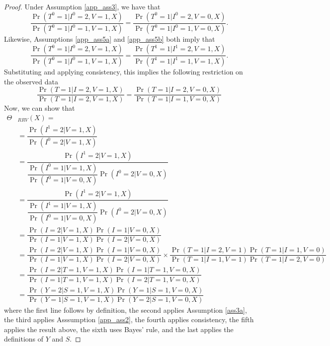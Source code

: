 \begin{appendix}
\begin{refsection}
\begin{proposition}
    \end{proposition}
    \begin{proof}
        Under Assumption \ref{app_ass3}, we have that 
        \[\dfrac{\Pr(T^0 = 1 | I^0 = 2, V = 1, X)}{\Pr(T^0 = 1 | I^0 = 1, V = 1, X)} = \dfrac{\Pr(T^0 = 1 | I^0 = 2, V = 0, X)}{\Pr(T^0 = 1 | I^0 = 1, V = 0, X)}.\]
        Likewise, Assumptions \ref{app_ass5a} and \ref{app_ass5b} both imply that 
        \[\dfrac{\Pr(T^0 = 1 | I^0 = 2, V = 1, X)}{\Pr(T^0 = 1 | I^0 = 1, V = 1, X)} = \dfrac{\Pr(T^1 = 1 | I^1 = 2, V = 1, X)}{\Pr(T^1 = 1 | I^1 = 1, V = 1, X)}.\]
        Substituting and applying consistency, this implies the following restriction on the observed data
        \[\dfrac{\Pr(T = 1 | I = 2, V = 1, X)}{\Pr(T = 1 | I = 2, V = 1, X)}= \dfrac{\Pr(T = 1 | I = 2, V = 0, X)}{\Pr(T = 1 | I = 1, V = 0, X)}\]        
        Now, we can show that
        \begin{align*}
            \Theta&_{RRV}(X) = \\
            &= \dfrac{\Pr(I^1 = 2 | V = 1, X)}{\Pr(I^0 = 2| V = 1, X)} \\
            &= \dfrac{\Pr(I^1 = 2 | V = 1, X)}{\dfrac{\Pr(I^0 = 1| V = 1, X)}{\Pr(I^0 = 1| V = 0, X)}\Pr(I^0 = 2| V = 0, X)} \\
            &= \dfrac{\Pr(I^1 = 2 | V = 1, X)}{\dfrac{\Pr(I^1 = 1| V = 1, X)}{\Pr(I^0 = 1| V = 0, X)}\Pr(I^0 = 2| V = 0, X)} \\
            &= \dfrac{\Pr(I = 2 | V = 1, X)\Pr(I = 1| V = 0, X)}{\Pr(I = 1| V = 1, X)\Pr(I = 2| V = 0, X)} \\
            &= \dfrac{\Pr(I = 2 | V = 1, X)\Pr(I = 1| V = 0, X)}{\Pr(I = 1| V = 1, X)\Pr(I = 2| V = 0, X)} \times \dfrac{\Pr(T = 1 | I = 2, V = 1)\Pr(T = 1 | I = 1, V = 0)}{\Pr(T = 1 | I = 1, V = 1)\Pr(T = 1 | I = 2, V = 0)} \\
            &= \dfrac{\Pr(I = 2 | T=1, V = 1, X)\Pr(I = 1| T=1, V = 0, X)}{\Pr(I = 1| T=1, V = 1, X)\Pr(I = 2| T = 1, V = 0, X)}  \\
             &= \dfrac{\Pr(Y = 2 | S=1, V = 1, X)\Pr(Y = 1| S=1, V = 0, X)}{\Pr(Y = 1| S=1, V = 1, X)\Pr(Y = 2| S = 1, V = 0, X)}  
        \end{align*}
        where the first line follows by definition, the second applies Assumption \ref{ass3a}, the third applies Asssumption \ref{app_ass2}, the fourth applies consistency, the fifth applies the result above, the sixth uses Bayes' rule, and the last applies the definitions of $Y$ and $S$.
    \end{proof}


\end{refsection}
\end{appendix}
